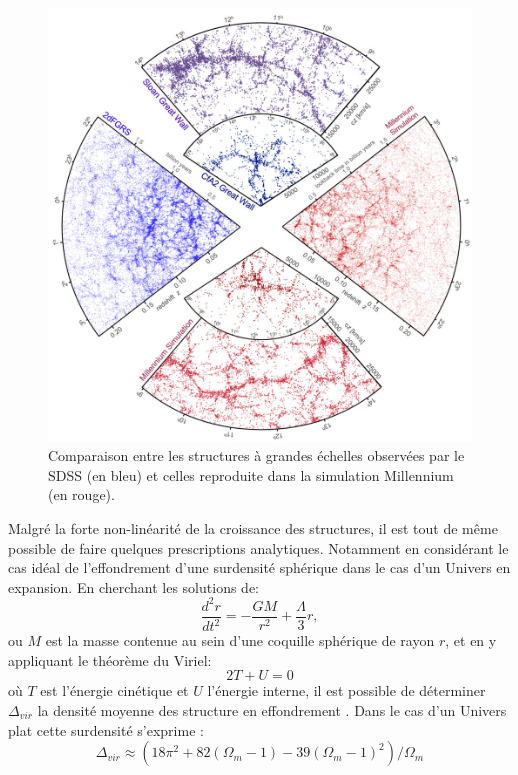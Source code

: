 \begin{figure}
        \includegraphics[width=.95\linewidth]{img/02/sdss_millenium.jpeg} 
        \caption[SDSS - Millennium]{Comparaison entre les structures à grandes échelles observées par le SDSS (en bleu) et celles reproduite dans la simulation Millennium \citep{2005Natur.435..629S} (en rouge).
 		\label{fig:sdss}}
\end{figure}

Malgré la forte non-linéarité de la croissance des structures, il est tout de même possible de faire quelques prescriptions analytiques.
Notamment en considérant le cas idéal de l'effondrement d'une surdensité sphérique dans le cas d'un Univers en expansion.
En cherchant les solutions de:
\begin{equation}
\frac{d^2r}{dt^2} = -\frac{GM}{r^2} + \frac{\Lambda}{3}r, 
\end{equation}
ou $M$ est la masse contenue au sein d'une coquille sphérique de rayon $r$, et en y appliquant le théorème du Viriel:
\begin{equation}
2T+U=0
\end{equation}
où $T$ est l'énergie cinétique et $U$ l'énergie interne, il est possible de déterminer $\Delta_{vir}$ la densité moyenne des structure en effondrement \citep{2010gfe..book.....M}.
Dans le cas d'un Univers plat cette surdensité s'exprime :
\begin{equation}
\Delta_{vir} \approx (18 \pi ^2 + 82 (\Omega_m-1) - 39 (\Omega_m-1)^2)/ \Omega_m
\end{equation}

